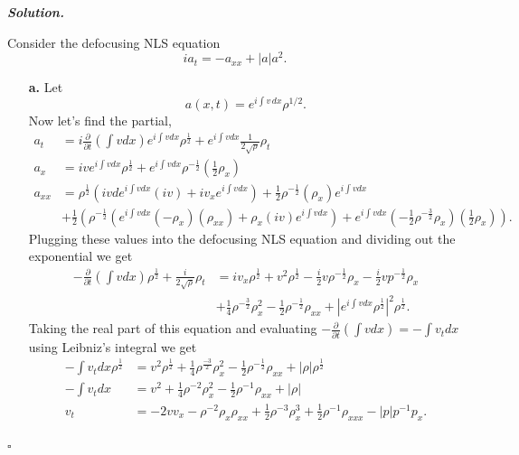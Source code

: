 \documentclass[12pt]{report}
\newenvironment{solution}[1][\it{Solution}]{\textbf{#1. } }{$\square$}
\newcommand{\paren}[1]{{\left(#1\right)}} %
\newcommand{\abs}[1]{{\left|#1\right|}} %
\newcommand{\pp}[2]{\frac{\partial #1}{\partial #2}} %
\begin{document}
\begin{solution}

    \noindent
    Consider the defocusing NLS equation
    \[ i a_t = -a_{xx} + \abs{a}a^2.\]
    \begin{enumerate}
        \item[{\bf a.}]
        Let 
        \[
            a(x,t)=e^{i \int v \,dx} \rho^{1/2}. 
        \]
        Now let's find the partial,
        \begin{align*}
            a_t &= i \pp{}{t}\paren{\int v dx}e^{i \int v dx}\rho^{\frac{1}{2}} + e^{i\int v dx}\frac{1}{2\sqrt{\rho}}\rho_t\\
            a_{x} &= ive^{i\int v dx}\rho^{\frac{1}{2}} + e^{i\int v dx}\rho^{-\frac{1}{2}}\paren{\frac{1}{2}\rho_x}\\
            a_{xx} &= \rho^{\frac{1}{2}}\paren{ivde^{i\int v dx}(iv) + iv_xe^{i \int v dx}} + \frac{1}{2}\rho^{-\frac{1}{2}}(\rho_x)e^{i \int v dx}\\ 
            &+ \frac{1}{2}\paren{\rho^{-\frac{1}{2}}\paren{e^{i\int v dx}(-\rho_x)(\rho_{xx}) + \rho_x(iv)e^{i \int v dx}} + e^{i \int v dx}(-\frac{1}{2}\rho^{-\frac{3}{2}}\rho_x)(\frac{1}{2}\rho_x)}.
        \end{align*}
        Plugging these values into the defocusing NLS equation and dividing out the exponential we get
        \begin{align*}
            -\pp{}{t}\paren{\int v dx}\rho^{\frac{1}{2}} + \frac{i}{2\sqrt{\rho}}\rho_t &= iv_x\rho^{\frac{1}{2}} + v^2\rho^\frac{1}{2} - \frac{i}{2}v\rho^{-\frac{1}{2}}\rho_x - \frac{i}{2}vp^{-\frac{1}{2}}\rho_x\\ 
            &+ \frac{1}{4}\rho^{-\frac{3}{2}}\rho_x^2 - \frac{1}{2}\rho^{-\frac{1}{2}}\rho_{xx} + \abs{e^{i \int v dx}\rho^\frac{1}{2}}^2 \rho^{\frac{1}{2}}.
        \end{align*}
        Taking the real part of this equation and evaluating $-\pp{}{t}\paren{\int v dx} = -\int v_t dx$ using Leibniz's integral we get
        \begin{align*}
            -\int v_t dx \rho^{\frac{1}{2}} &= v^2 \rho^{\frac{1}{2}} + \frac{1}{4}\rho^{\frac{-3}{2}}\rho_x^2 - \frac{1}{2}\rho^{-\frac{1}{2}}\rho_{xx} + \abs{\rho}\rho^{\frac{1}{2}}\\
            -\int v_t dx &= v^2 + \frac{1}{4}\rho^{-2}\rho_x^2 - \frac{1}{2}\rho^{-1}\rho_{xx} + \abs{\rho}\\
            v_t &= -2vv_x - \rho^{-2}\rho_x\rho_{xx} + \frac{1}{2}\rho^{-3}\rho_x^3 + \frac{1}{2}\rho^{-1}\rho_{xxx}-\abs{p}p^{-1}p_x.

\end{align*}
\end{enumerate}
\end{solution}
\end{document}
